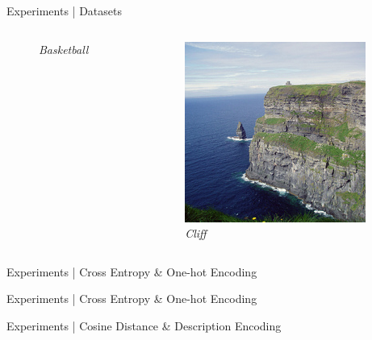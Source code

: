 \begin{frame}{Experiments | Datasets}
\begin{columns}
\begin{column}{0.2\textwidth}
\begin{figure}
        \captionsetup{labelformat=empty, justification=centering, font=scriptsize}
        \caption{\emph{Basketball}}
      \end{figure}
    \end{column}
    \begin{column}{0.2\textwidth}
      \begin{figure}
        \centering
        \includegraphics[width=.7\linewidth]{figures/tieredImageNet/example_3.jpg}
        \captionsetup{labelformat=empty, justification=centering, font=scriptsize}
        \caption{\emph{Cliff}}
      \end{figure}
    \end{column}
  \end{columns}

\end{frame}


\begin{frame}{Experiments | Cross Entropy \& One-hot Encoding}
  
\end{frame}

\begin{frame}{Experiments | Cross Entropy \& One-hot Encoding}
  
\end{frame}

\begin{frame}{Experiments | Cosine Distance \& Description Encoding}
  
\end{frame}

